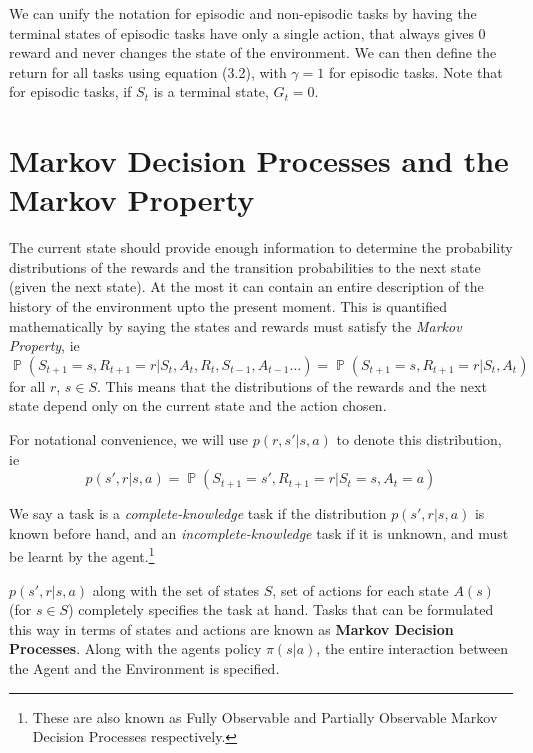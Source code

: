 \documentclass[12pt]{report}
\begin{document}
We can unify the notation for episodic and non-episodic tasks by having the terminal states of episodic tasks have only a single action, that always gives $0$ reward and never changes the state of the environment.
We can then define the return for all tasks using equation (3.2), with $\gamma = 1$ for episodic tasks. Note that for episodic tasks, if $S_{t}$ is a terminal state, $G_{t} = 0$.

\section{Markov Decision Processes and the Markov Property}
The current state should provide enough information to determine the probability distributions of the rewards and the transition probabilities to the next state (given the next state). At the most it can contain an entire description of the history of the environment 
upto the present moment. This is quantified mathematically by saying the states and rewards must satisfy the \textit{Markov Property}, ie 
\begin{equation}
    \mathop{\mathbb{P}}(S_{t + 1} = s, R_{t + 1} = r | S_{t}, A_{t}, R_{t}, S_{t - 1}, A_{t - 1} \dots) = \mathop{\mathbb{P}}(S_{t + 1} = s, R_{t + 1} = r | S_{t}, A_{t})
\end{equation}
for all $r$, $s \in S$. This means that the distributions of the rewards and the next state depend only on the current state and the action chosen.

For notational convenience, we will use $p(r, s' | s, a)$ to denote this distribution, ie 
\begin{equation}
    p(s', r | s, a) = \mathop{\mathbb{P}}(S_{t + 1} = s', R_{t + 1} = r | S_{t} = s, A_{t} = a)
\end{equation}

We say a task is a \textit{complete-knowledge} task if the distribution $p(s', r | s, a)$ is known before hand, and an \textit{incomplete-knowledge} task if it is unknown, and must be learnt by the agent.\footnote{These are also known as Fully Observable and Partially Observable Markov Decision Processes respectively.}

$p(s', r | s, a)$ along with the set of states $S$, set of actions for each state $A(s)$ (for $s \in S$) completely specifies the task at hand. Tasks that can be formulated this way in terms of 
states and actions are known as \textbf{Markov Decision Processes}. Along with the agents policy $\pi(s | a)$, the entire interaction between the Agent and the Environment is specified.
\end{document}
